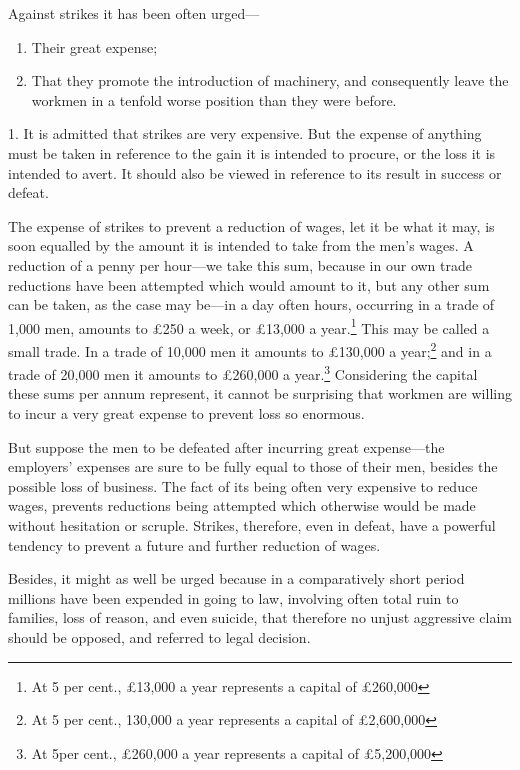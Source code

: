 Against strikes it has been often urged---

\begin{enumerate}
    \item Their great expense;
    \item That they promote the introduction of machinery, and
    consequently leave the workmen in a tenfold worse position than they
    were before.
\end{enumerate}

1. It is admitted that strikes are very expensive. But the expense of
anything must be taken in reference to the gain it is intended to
procure, or the loss it is intended to avert. It should also be viewed
in reference to its result in success or defeat.

The expense of strikes to prevent a reduction of wages, let it be what
it may, is soon equalled by the amount it is intended to take from the
men's wages. A reduction of a penny per hour---we take this sum, because
in our own trade reductions have been attempted which would amount to
it, but any other sum can be taken, as the case may be---in a day often
hours, occurring in a trade of 1,000 men, amounts to £250 a week, or
£13,000 a year.\footnote{At 5 per cent., £13,000 a year represents a
capital of £260,000} This may be called a small trade. In a trade of
10,000 men it amounts to £130,000 a year;\footnote{At 5 per cent.,
130,000 a year represents a capital of £2,600,000} and in a trade of
20,000 men it amounts to £260,000 a year.\footnote{At 5per cent.,
£260,000 a year represents a capital of £5,200,000} Considering the
capital these sums per annum represent, it cannot be surprising that
workmen are willing to incur a very great expense to prevent loss so
enormous.

But suppose the men to be defeated after incurring great expense---the
employers' expenses are sure to be fully equal to those of their men,
besides the possible loss of business. The fact of its being often very
expensive to reduce wages, prevents reductions being attempted which
otherwise would be made without hesitation or scruple. Strikes,
therefore, even in defeat, have a powerful tendency to prevent a future
and further reduction of wages.

Besides, it might as well be urged because in a comparatively short
period millions have been expended in going to law, involving often
total ruin to families, loss of reason, and even suicide, that therefore
no unjust aggressive claim should be opposed, and referred to legal
decision.

